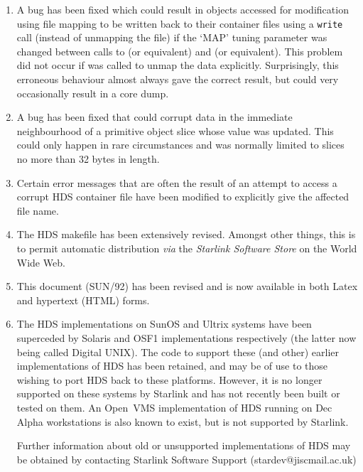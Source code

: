 \documentclass[twoside,11pt]{starlink}
\providecommand{\hi}[1]{{\texttt{#1}}}
\providecommand{\st}[1]{{\emph{#1}}}
\begin{document}
\begin{enumerate}
\item A bug has been fixed which could result in objects accessed for
modification using file mapping to be written back to their container
files using a \hi{write} call (instead of unmapping the file) if the
`MAP' tuning parameter was changed between calls to
 (or equivalent) and
 (or equivalent). This problem did not
occur if  was called to unmap the data
explicitly. Surprisingly, this erroneous behaviour almost always gave
the correct result, but could very occasionally result in a core dump.

\item A bug has been fixed that could corrupt data in the immediate
neighbourhood of a primitive object slice whose value was
updated. This could only happen in rare circumstances and was normally
limited to slices no more than 32 bytes in length.

\item Certain error messages that are often the result of an attempt
to access a corrupt HDS container file have been modified to
explicitly give the affected file name.

\item The HDS makefile has been extensively revised. Amongst other
things, this is to permit automatic distribution \st{via} the
\st{Starlink Software Store} on the World Wide Web.

\item This document (SUN/92) has been revised and is now available in
both Latex and hypertext (HTML) forms.

\item The HDS implementations on SunOS and Ultrix systems have been
superceded by Solaris and OSF1 implementations respectively (the
latter now being called Digital UNIX). The code to support these (and
other) earlier implementations of HDS has been retained, and may be of
use to those wishing to port HDS back to these platforms. However, it
is no longer supported on these systems by Starlink and has not
recently been built or tested on them.  An Open~VMS implementation of
HDS running on Dec Alpha workstations is also known to exist, but is
not supported by Starlink.

Further information about old or unsupported implementations of HDS
may be obtained by contacting Starlink Software Support
(stardev@jiscmail.ac.uk)

\end{enumerate}
\end{document}
